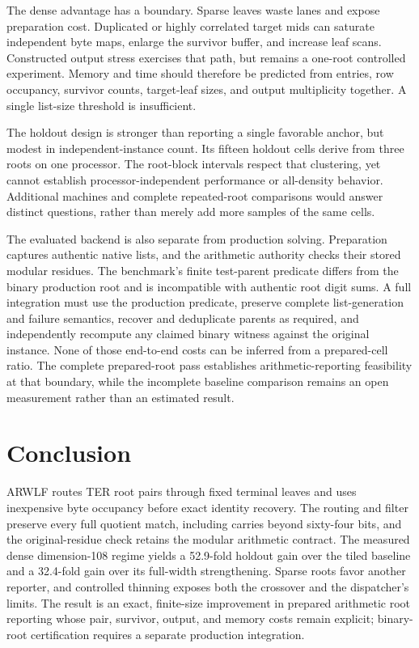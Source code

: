 \documentclass[manuscript,screen,review]{acmart}
\begin{document}
The dense advantage has a boundary. Sparse leaves waste lanes and expose preparation cost. Duplicated or highly correlated target mids can saturate independent byte maps, enlarge the survivor buffer, and increase leaf scans. Constructed output stress exercises that path, but remains a one-root controlled experiment. Memory and time should therefore be predicted from entries, row occupancy, survivor counts, target-leaf sizes, and output multiplicity together. A single list-size threshold is insufficient.

The holdout design is stronger than reporting a single favorable anchor, but modest in independent-instance count. Its fifteen holdout cells derive from three roots on one processor. The root-block intervals respect that clustering, yet cannot establish processor-independent performance or all-density behavior. Additional machines and complete repeated-root comparisons would answer distinct questions, rather than merely add more samples of the same cells.

The evaluated backend is also separate from production solving. Preparation captures authentic native lists, and the arithmetic authority checks their stored modular residues. The benchmark's finite test-parent predicate differs from the binary production root and is incompatible with authentic root digit sums. A full integration must use the production predicate, preserve complete list-generation and failure semantics, recover and deduplicate parents as required, and independently recompute any claimed binary witness against the original instance. None of those end-to-end costs can be inferred from a prepared-cell ratio. The complete prepared-root pass establishes arithmetic-reporting feasibility at that boundary, while the incomplete baseline comparison remains an open measurement rather than an estimated result.

\section{Conclusion}
ARWLF routes TER root pairs through fixed terminal leaves and uses inexpensive byte occupancy before exact identity recovery. The routing and filter preserve every full quotient match, including carries beyond sixty-four bits, and the original-residue check retains the modular arithmetic contract. The measured dense dimension-108 regime yields a 52.9-fold holdout gain over the tiled baseline and a 32.4-fold gain over its full-width strengthening. Sparse roots favor another reporter, and controlled thinning exposes both the crossover and the dispatcher's limits. The result is an exact, finite-size improvement in prepared arithmetic root reporting whose pair, survivor, output, and memory costs remain explicit; binary-root certification requires a separate production integration.
\end{document}
